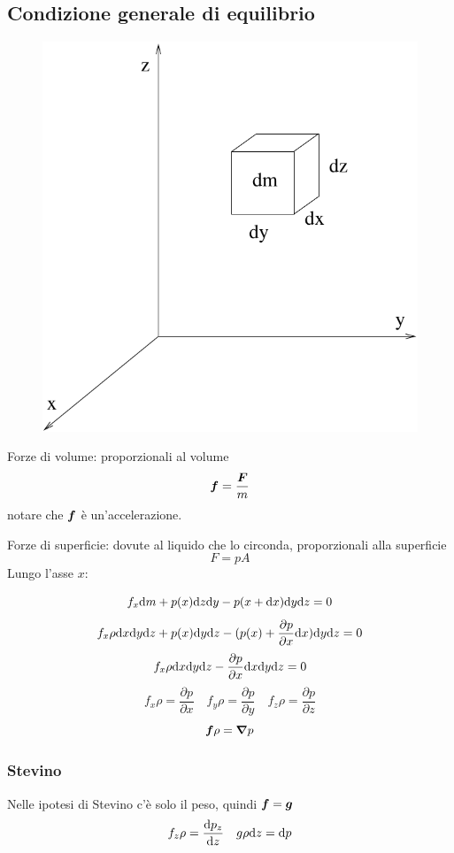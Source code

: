 \subsection{Condizione generale di equilibrio}
\begin{figure}[htbp]
   \centering
   \includegraphics[scale=0.4]{immagini/fisica1/equilibrio}
\end{figure}
Forze di volume: proporzionali al volume
$$\boldsymbol{f}=\frac{\boldsymbol{F}}{m}$$
notare che $\boldsymbol{f}$ è un'accelerazione.


Forze di superficie: dovute al liquido che lo circonda, proporzionali alla superficie
$$F=pA$$
Lungo l'asse $x$:

$$f_x\mathrm{d} m+p(x)\mathrm{d} z\mathrm{d} y-p(x+\mathrm{d} x)\mathrm{d} y\mathrm{d} z=0$$
$$f_x\rho\mathrm{d} x\mathrm{d} y\mathrm{d} z+p(x)\mathrm{d} y\mathrm{d} z-(p(x)+\frac{\partial p}{\partial x}\mathrm{d} x)\mathrm{d} y\mathrm{d} z=0$$
$$f_x\rho\mathrm{d} x\mathrm{d} y\mathrm{d} z-\frac{\partial p}{\partial {x}}\mathrm{d} x\mathrm{d} y\mathrm{d} z=0$$
$$f_x\rho=\frac{\partial p}{\partial x}\quad f_y\rho=\frac{\partial p}{\partial y}\quad f_z\rho=\frac{\partial p}{\partial z}$$
$$\boldsymbol{f}\rho=\boldsymbol{\nabla} p$$

\subsubsection{Stevino}
Nelle ipotesi di Stevino c'è solo il peso, quindi $\boldsymbol{f}=\boldsymbol{g}$
$$f_z\rho=\frac{\mathrm{d} p_z}{\mathrm{d} z}\quad g\rho\mathrm{d} z=\mathrm{d} p$$

